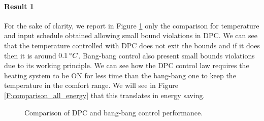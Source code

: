 \paragraph{Result 1} For the sake of clarity, we report in Figure \ref{F:comparison_small} only the comparison for temperature and input schedule obtained allowing small bound violations in DPC. We can see that the temperature controlled with DPC does not exit the bounds and if it does then it is around $0.1\,\degree C$. Bang-bang control also present small bounds violations due to its working principle. We can see how the DPC control law requires the heating system to be ON for less time than the bang-bang one to keep the temperature in the comfort range. We will see in Figure \ref{F:comparison_all_energy} that this translates in energy saving.

\begin{figure}[h!]
	\begin{center}
	\end{center}
	\caption{Comparison of DPC and bang-bang control performance.}
	\captionsetup{justification=centering}
	\label{F:comparison_small}
\end{figure}

